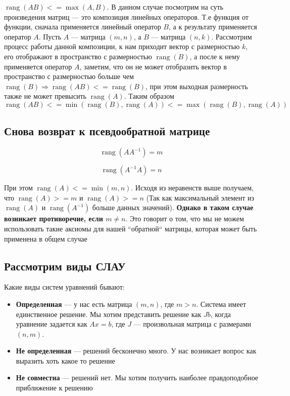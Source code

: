 \documentclass{article}
\begin{document}
    $\operatorname{rang}(AB) <= \max(A, B)$.
    В данном случае посмотрим на суть произведения матриц --- это композиция линейных операторов.
    Т.е функция от функции, сначала применяется линейный оператор $B$, а к результату применяется оператор $A$.
    Пусть $A$ --- матрица $(m, n)$, а $B$ --- матрица $(n, k)$.
    Рассмотрим процесс работы данной композиции, к нам приходит вектор с размерностью $k$, его отображают в пространство с размерностью
    $\operatorname{rang}(B)$, а после к нему применяется оператор $A$, заметим,
    что он не может отобразить вектор в пространство с размерностью больше чем $\operatorname{rang}(B) \Rightarrow
    \operatorname{rang}(AB) <= \operatorname{rang}(B)$, при этом выходная размерность также не может превысить $\operatorname{rang}(A)$.
    Таким образом $\operatorname{rang}(AB) <= \min(\operatorname{rang}(B), \operatorname{rang}(A)) <= \max(\operatorname{rang}(B), \operatorname{rang}(A))$

    \subsection{Снова возврат к псевдообратной матрице}

    \begin{equation}
        \operatorname{rang}(A A^{-1}) = m
    \end{equation}

    \begin{equation}
        \operatorname{rang}(A^{-1} A) = n
    \end{equation}

    При этом $\operatorname{rang}(A) <= \min(m, n)$.
    Исходя из неравенств выше получаем,
    что $\operatorname{rang}(A) >= m$ и $\operatorname{rang}(A) >= n$
    (Так как максимальный элемент из $\operatorname{rang}(A)$ и $\operatorname{rang}(A^{-1})$
    больше данных значений).
    \textbf{Однако в таком случае возникает противоречие, если $m \neq n$}.
    Это говорит о том, что мы не можем использовать такие аксиомы для нашей ``обратной``
    матрицы, которая может быть применена в общем случае


    \subsection{Рассмотрим виды СЛАУ}

    Какие виды систем уравнений бывают:

    \begin{itemize}
        \item \textbf{Определенная} --- у нас есть матрица $(m, n)$, где $m > n$.
        Система имеет единственное решение.
        Мы хотим представить решение как $J b$,
        когда уравнение задается как $Ax = b$, где $J$ --- произвольная матрица с размерами
        $(n, m)$.
        \item \textbf{Не определенная} --- решений бесконечно много.
        У нас возникает вопрос как выразить хоть какое то решение
        \item \textbf{Не совместна} --- решений нет.
        Мы хотим получить наиболее правдоподобное приближение к решению
    \end{itemize}
\end{document}
